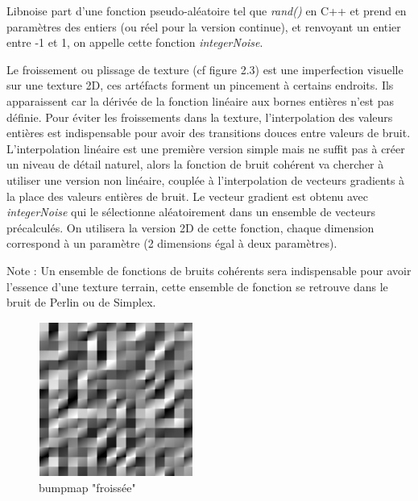 \documentclass[12pt]{report}
\begin{document}
    Libnoise part d'une fonction pseudo-aléatoire tel que \textit{rand()} en C++ et prend en paramètres des entiers (ou réel pour la version continue), et renvoyant un entier entre -1 et 1, on appelle cette fonction \textit{integerNoise}.
    
    Le froissement ou plissage de texture (cf figure 2.3) est une imperfection visuelle sur une texture 2D, ces artéfacts forment un pincement à certains endroits. Ils apparaissent car la dérivée de la fonction linéaire aux bornes entières n'est pas définie. Pour éviter les froissements dans la texture, l'interpolation des valeurs entières est indispensable pour avoir des transitions douces entre valeurs de bruit. L'interpolation linéaire est une première version simple mais ne suffit pas à créer un niveau de détail naturel, alors la fonction de bruit cohérent va chercher à utiliser une version non linéaire, couplée à l'interpolation de vecteurs gradients à la place des valeurs entières de bruit. Le vecteur gradient est obtenu avec \textit{integerNoise} qui le sélectionne aléatoirement dans un ensemble de vecteurs précalculés. On utilisera la version 2D de cette fonction, chaque dimension correspond à un paramètre (2 dimensions égal à deux paramètres).
    
    Note : Un ensemble de fonctions de bruits cohérents sera indispensable pour avoir l'essence d'une texture terrain, cette ensemble de fonction se retrouve dans le bruit de Perlin ou de Simplex.
    
     \begin{figure}[h]
        \begin{center}
        \includegraphics[scale = 0.7]{images/bumpvalue.png}
        \caption{bumpmap "froissée"}
        \end{center}
    \end{figure}
    
\end{document}
